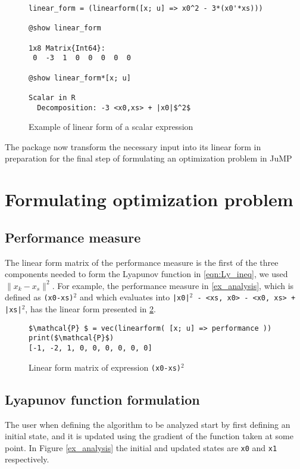 \begin{figure}[h!]
    \begin{lstlisting}[mathescape] 
linear_form = (linearform([x; u] => x0^2 - 3*(x0'*xs)))

@show linear_form

1x8 Matrix{Int64}:
 0  -3  1  0  0  0  0  0

@show linear_form*[x; u]

Scalar in R
  Decomposition: -3 <x0,xs> + |x0|$^2$
\end{lstlisting}    
\caption{Example of linear form of a scalar expression}
\label{ex_linearform}
\end{figure}

The package now transform the necessary input into its linear form in preparation for the final step of formulating an optimization problem in JuMP

\section{Formulating optimization problem}

\subsection*{Performance measure}
The linear form matrix of the performance measure is the first of the three components needed to form the Lyapunov function in \eqref{eqn:Ly_ineq}, we used $\|x_k - x_s\|^2$. For example, the performance measure in \cref{ex_analysis}, which is defined as \texttt{(x0-xs)$^2$} and which evaluates into \texttt{|x0|$^2$ - <xs, x0> - <x0, xs> + |xs|$^2$}, has the linear form presented in \cref{ex_linearform2}.

\begin{figure}[h!]
\begin{lstlisting}[mathescape]
$\mathcal{P} $ = vec(linearform( [x; u] => performance ))
print($\mathcal{P}$)
[-1, -2, 1, 0, 0, 0, 0, 0, 0]
\end{lstlisting}
\caption{Linear form matrix of expression \texttt{(x0-xs)$^2$}}
\label{ex_linearform2}
\end{figure}

\subsection*{Lyapunov function formulation}

The user when defining the algorithm to be analyzed start by first defining an initial state, and it is updated using the gradient of the function taken at some point. In Figure \ref*{ex_analysis} the initial and updated states are \texttt{x0} and \texttt{x1} respectively.


